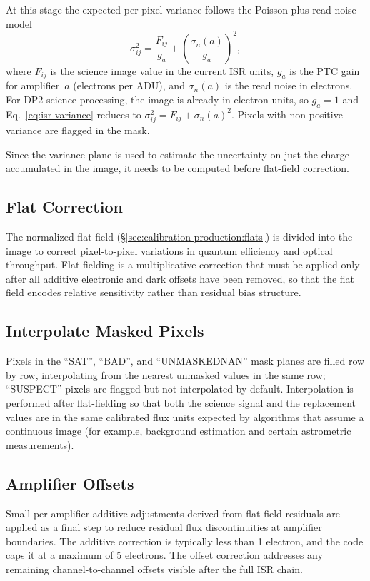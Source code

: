 At this stage the expected per-pixel variance follows the Poisson-plus-read-noise model
\begin{equation}
    \sigma^2_{ij} = \frac{F_{ij}}{g_a} + \left(\frac{\sigma_n(a)}{g_a}\right)^2,
    \label{eq:isr-variance}
\end{equation}
where $F_{ij}$ is the science image value in the current ISR units, $g_a$ is the PTC gain for amplifier~$a$ (electrons per ADU), and $\sigma_n(a)$ is the read noise in electrons.
For DP2 science processing, the image is already in electron units, so $g_a = 1$ and Eq.~\ref{eq:isr-variance} reduces to $\sigma^2_{ij} = F_{ij} + \sigma_n(a)^2$.
Pixels with non-positive variance are flagged in the mask.

Since the variance plane is used to estimate the uncertainty on just the charge accumulated in the image, it needs to be computed before flat-field correction.

\subsection{Flat Correction}
The normalized flat field (\S\ref{sec:calibration-production:flats}) is divided into the image to correct pixel-to-pixel variations in quantum efficiency and optical throughput.
Flat-fielding is a multiplicative correction that must be applied only after all additive electronic and dark offsets have been removed, so that the flat field encodes relative sensitivity rather than residual bias structure.

\subsection{Interpolate Masked Pixels}
Pixels in the ``SAT'', ``BAD'', and ``UNMASKEDNAN'' mask planes are filled row by row, interpolating from the nearest unmasked values in the same row; ``SUSPECT'' pixels are flagged but not interpolated by default.
Interpolation is performed after flat-fielding so that both the science signal and the replacement values are in the same calibrated flux units expected by algorithms that assume a continuous image (for example, background estimation and certain astrometric measurements).

\subsection{Amplifier Offsets}
Small per-amplifier additive adjustments derived from flat-field residuals are applied as a final step to reduce residual flux discontinuities at amplifier boundaries.
The additive correction is typically less than 1 electron, and the code caps it at a maximum of 5 electrons.
The offset correction addresses any remaining channel-to-channel offsets visible after the full ISR chain.

